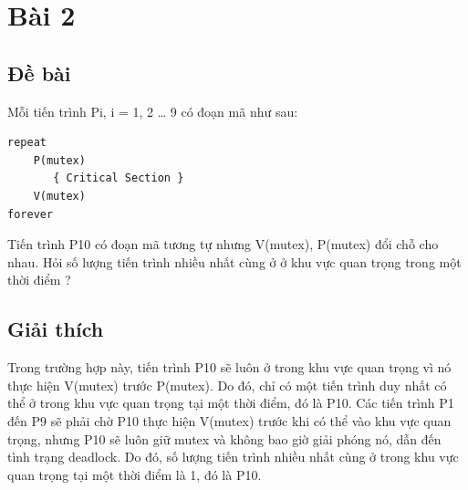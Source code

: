 \documentclass[12pt, letterpaper]{article}
\begin{document}
\section{Bài 2}
\subsection{Đề bài}
Mỗi tiến trình Pi, i = 1, 2 … 9 có đoạn mã như sau:
\begin{lstlisting}
repeat
    P(mutex)
       { Critical Section }
    V(mutex)
forever
\end{lstlisting}
Tiến trình P10 có đoạn mã tương tự nhưng V(mutex), P(mutex) đổi chỗ cho nhau. Hỏi số lượng tiến trình nhiều nhất cùng ở ở khu vực quan trọng trong một thời điểm ?
\subsection{Giải thích}
Trong trường hợp này, tiến trình P10 sẽ luôn ở trong khu vực quan trọng vì nó thực hiện V(mutex) trước P(mutex). Do đó, chỉ có một tiến trình duy nhất có thể ở trong khu vực quan trọng tại một thời điểm, đó là P10. Các tiến trình P1 đến P9 sẽ phải chờ P10 thực hiện V(mutex) trước khi có thể vào khu vực quan trọng, nhưng P10 sẽ luôn giữ mutex và không bao giờ giải phóng nó, dẫn đến tình trạng deadlock. Do đó, số lượng tiến trình nhiều nhất cùng ở trong khu vực quan trọng tại một thời điểm là 1, đó là P10.
\end{document}
